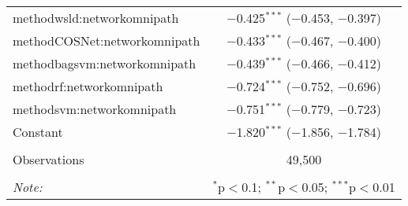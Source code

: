 \begin{table}[!htbp]
\begin{tabular}{@{\extracolsep{5pt}}lc}
  methodwsld:networkomnipath & $-$0.425$^{***}$ ($-$0.453, $-$0.397) \\ 
  methodCOSNet:networkomnipath & $-$0.433$^{***}$ ($-$0.467, $-$0.400) \\ 
  methodbagsvm:networkomnipath & $-$0.439$^{***}$ ($-$0.466, $-$0.412) \\ 
  methodrf:networkomnipath & $-$0.724$^{***}$ ($-$0.752, $-$0.696) \\ 
  methodsvm:networkomnipath & $-$0.751$^{***}$ ($-$0.779, $-$0.723) \\ 
  Constant & $-$1.820$^{***}$ ($-$1.856, $-$1.784) \\ 
 \hline \\[-1.8ex] 
Observations & 49,500 \\ 
\hline 
\hline \\[-1.8ex] 
\textit{Note:}  & \multicolumn{1}{r}{$^{*}$p$<$0.1; $^{**}$p$<$0.05; $^{***}$p$<$0.01} \\ 
\end{tabular} 
\end{table} 

